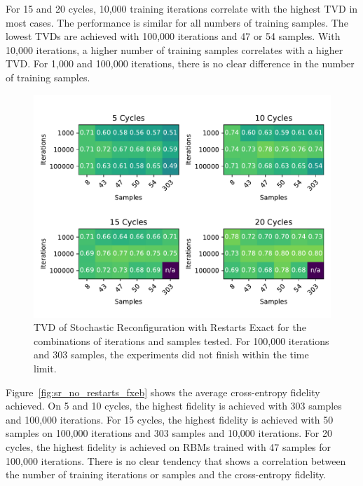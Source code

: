 For 15 and 20 cycles, 10,000 training iterations correlate with the highest TVD in most cases.
The performance is similar for all numbers of training samples. The lowest TVDs are achieved with 100,000
iterations and 47 or 54 samples. With 10,000 iterations, a higher number of training samples correlates 
with a higher TVD. For 1,000 and 100,000 iterations, there is no clear difference in the number of training 
samples.

\begin{figure}[H]
  \centering
  \includegraphics[width=\textwidth]{figures/results/SR-restarts-not-learned/tvd_heatmap.pdf}
  \caption[TVD of Stochastic Reconfiguration with Restarts Exact]{TVD of Stochastic 
  Reconfiguration with Restarts Exact for the combinations of iterations and samples tested.
  For 100,000 iterations and 303 samples, the experiments did not finish within the time limit.}
  \label{fig:sr_exact_tvd}
\end{figure}

Figure~\ref{fig:sr_no_restarts_fxeb} shows the average cross-entropy fidelity achieved. On 5 and 10
cycles, the highest fidelity is achieved with 303 samples and 100,000 iterations. 
For 15 cycles, the highest fidelity is achieved with 50 samples on 100,000 iterations and 
303 samples and 10,000 iterations.
For 20 cycles, the highest fidelity is achieved on RBMs trained with 47 samples for 100,000 iterations.
There is no clear tendency that shows a correlation between 
the number of training iterations or samples and the cross-entropy fidelity.

